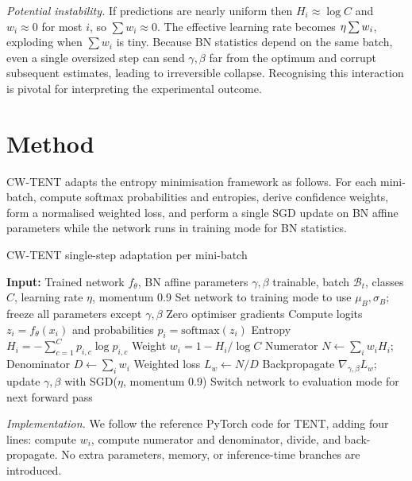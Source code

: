 \documentclass{article} %
\begin{document}
\textit{Potential instability.} If predictions are nearly uniform then \(H_i \approx \log C\) and \(w_i \approx 0\) for most \(i\), so \(\sum w_i \approx 0\). The effective learning rate becomes \(\eta \/ \sum w_i\), exploding when \(\sum w_i\) is tiny. Because BN statistics depend on the same batch, even a single oversized step can send \(\gamma, \beta\) far from the optimum and corrupt subsequent estimates, leading to irreversible collapse. Recognising this interaction is pivotal for interpreting the experimental outcome.

\section{Method}
\label{sec:method}
CW-TENT adapts the entropy minimisation framework as follows. For each mini-batch, compute softmax probabilities and entropies, derive confidence weights, form a normalised weighted loss, and perform a single SGD update on BN affine parameters while the network runs in training mode for BN statistics.

\begin{algorithm}
\caption{CW-TENT single-step adaptation per mini-batch}
\begin{algorithmic}[1]
\State \textbf{Input:} Trained network \(f_{\theta}\), BN affine parameters \(\gamma, \beta\) trainable, batch \(\mathcal{B}_t\), classes \(C\), learning rate \(\eta\), momentum 0.9
\State Set network to training mode to use \(\mu_{B}, \sigma_{B}\); freeze all parameters except \(\gamma, \beta\)
\State Zero optimiser gradients
  \State Compute logits \(z_i = f_{\theta}(x_i)\) and probabilities \(p_i = \mathrm{softmax}(z_i)\)
  \State Entropy \(H_i = -\sum_{c=1}^{C} p_{i,c} \log p_{i,c}\)
  \State Weight \(w_i = 1 - H_i / \log C\)
\EndFor
\State Numerator \(N \leftarrow \sum_{i} w_i H_i\); Denominator \(D \leftarrow \sum_{i} w_i\)
\State Weighted loss \(L_{w} \leftarrow N / D\)
\State Backpropagate \(\nabla_{\gamma,\beta} L_{w}\); update \(\gamma, \beta\) with SGD(\(\eta\), momentum 0.9)
\State Switch network to evaluation mode for next forward pass
\end{algorithmic}
\end{algorithm}

\textit{Implementation.} We follow the reference PyTorch code for TENT, adding four lines: compute \(w_i\), compute numerator and denominator, divide, and back-propagate. No extra parameters, memory, or inference-time branches are introduced.
\end{document}
